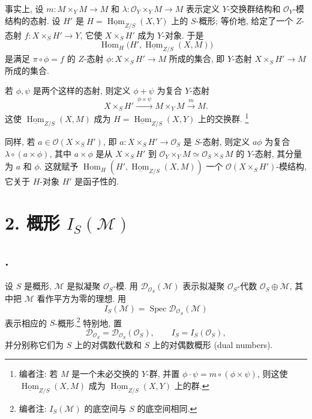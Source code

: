 事实上, 设 \(m:M\times_YM\to M\) 和
\(\lambda:\mathcal O_Y\times_YM\to M\) 表示定义
\(Y\)-交换群结构和 \(\mathcal O_Y\)-模结构的态射.
设 \(H'\) 是 \(H=\underline{\operatorname{Hom}}_{Z/S}(X,Y)\)
上的 \(S\)-概形; 等价地, 给定了一个 \(Z\)-态射
\(f:X\times_SH'\to Y\), 它使 \(X\times_SH'\) 成为 \(Y\)-对象. 于是
\[
  \operatorname{Hom}_H
    \bigl(H',\underline{\operatorname{Hom}}_{Z/S}(X,M)\bigr)
\]
是满足 \(\pi\circ\phi=f\) 的 \(Z\)-态射
\(\phi:X\times_SH'\to M\) 所成的集合, 即 \(Y\)-态射
\(X\times_SH'\to M\) 所成的集合.

若 \(\phi,\psi\) 是两个这样的态射, 则定义 \(\phi+\psi\)
为复合 \(Y\)-态射
\[
  X\times_SH'\xrightarrow{\ \phi\times\psi\ }
  M\times_YM\xrightarrow{\ m\ }M.
\]
这使 \(\underline{\operatorname{Hom}}_{Z/S}(X,M)\) 成为
\(H=\underline{\operatorname{Hom}}_{Z/S}(X,Y)\) 上的交换群.
\footnote{编者注: 若 \(M\) 是一个未必交换的 \(Y\)-群,
并置 \(\phi\cdot\psi=m\circ(\phi\times\psi)\), 则这使
\(\underline{\operatorname{Hom}}_{Z/S}(X,M)\) 成为
\(\underline{\operatorname{Hom}}_{Z/S}(X,Y)\) 上的群.}

同样, 若 \(a\in\mathcal O(X\times_SH')\), 即
\(a:X\times_SH'\to\mathcal O_S\) 是 \(S\)-态射, 则定义
\(a\phi\) 为复合 \(\lambda\circ(a\times\phi)\), 其中
\(a\times\phi\) 是从 \(X\times_SH'\) 到
\(\mathcal O_Y\times_YM\simeq\mathcal O_S\times_SM\) 的 \(Y\)-态射,
其分量为 \(a\) 和 \(\phi\). 这就赋予
\(\operatorname{Hom}_H(H',\underline{\operatorname{Hom}}_{Z/S}(X,M))\)
一个 \(\mathcal O(X\times_SH')\)-模结构, 它关于
\(H\)-对象 \(H'\) 是函子性的.

\section*{2. 概形 \(I_S(\mathcal M)\)}

\subsection*{.}
设 \(S\) 是概形, \(\mathcal M\) 是拟凝聚
\(\mathcal O_S\)-模. 用
\(\mathscr D_{\mathcal O_S}(\mathcal M)\) 表示拟凝聚
\(\mathcal O_S\)-代数 \(\mathcal O_S\oplus\mathcal M\),
其中把 \(\mathcal M\) 看作平方为零的理想. 用
\[
  I_S(\mathcal M)=\operatorname{Spec}
    \mathscr D_{\mathcal O_S}(\mathcal M)
\]
表示相应的 \(S\)-概形.\footnote{编者注:
\(I_S(\mathcal M)\) 的底空间与 \(S\) 的底空间相同.}
特别地, 置
\[
  \mathscr D_{\mathcal O_S}
  =\mathscr D_{\mathcal O_S}(\mathcal O_S),
  \qquad I_S=I_S(\mathcal O_S),
\]
并分别称它们为 \(S\) 上的对偶数代数和 \(S\) 上的对偶数概形
(dual numbers).

